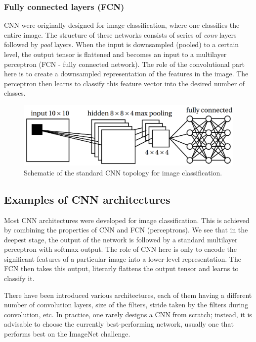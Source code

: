 \subsubsection{Fully connected layers (FCN)}

CNN were originally designed for image classification, where one classifies the entire image. The structure of these networks consists of series of \textit{conv} layers followed by \textit{pool} layers. When the input is downsampled (pooled) to a certain level, the output tensor is flattened and becomes an input to a multilayer perceptron (FCN - fully connected network). The role of the convolutional part here is to create a downsampled representation of the features in the image. The perceptron then learns to classify this feature vector into the desired number of classes. 

\vspace{4mm}
\begin{figure}[htb]
	\begin{center}
		\includegraphics*[width=12cm, keepaspectratio]{obr/fully.png}
	\end{center}
	\vspace{4mm}
	\caption{Schematic of the standard CNN topology for image classification. \cite{mehlig}} 
	\label{pool}
\end{figure}

\subsection{Examples of CNN architectures}

Most CNN architectures were developed for image classification. This is achieved by combining the properties of CNN and FCN (perceptrons). We see that in the deepest stage, the output of the network is followed by a standard multilayer perceptron with softmax output. The role of CNN here is only to encode the significant features of a particular image into a lower-level representation. The FCN then takes this output, literarly flattens the output tensor and learns to classify it.

There have been introduced various architectures, each of them having a different number of convolution layers, size of the filters, stride taken by the filters during convolution, etc. In practice, one rarely designs a CNN from scratch; instead, it is advisable to choose the currently best-performing network, usually one that performs best on the ImageNet challenge. \cite{stanford-github}

